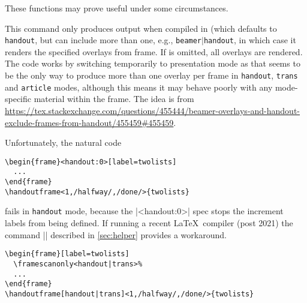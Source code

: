 \documentclass[a4paper]{ltxdoc}
\begin{document}
These functions may prove useful under some circumstances.

\begin{command}{\handoutframe{}}
  This command only produces output when compiled in  (which
  defaults to \texttt{handout}, but can include more than one, e.g.,
  \texttt{beamer$\mid$handout}, in which case it renders the specified overlays from frame.
  If  is omitted, all overlays are rendered.  The
  code works by switching temporarily to presentation mode as that seems to be
  the only way to produce more than one overlay per frame in \texttt{handout},
  \texttt{trans} and \texttt{article} modes, although this means it may behave
  poorly with any mode-specific material within the frame.  The idea is from
  \url{https://tex.stackexchange.com/questions/455444/beamer-overlays-and-handout-exclude-frames-from-handout/455459#455459}.
\end{command}

Unfortunately,  the natural code
\example
\begin{verbatim}
\begin{frame}<handout:0>[label=twolists]
  ...
\end{frame}
\handoutframe<1,/halfway/,/done/>{twolists}
\end{verbatim}
fails in \texttt{handout} mode, because the |<handout:0>| spec stops the
increment labels from being defined.  If running a recent \LaTeX\ compiler (post
2021) the command || described in \cref{sec:helper}
provides a workaround.
\example
\begin{verbatim}
\begin{frame}[label=twolists]
  \framescanonly<handout|trans>%
  ...
\end{frame}
\handoutframe[handout|trans]<1,/halfway/,/done/>{twolists}
\end{verbatim}


\end{document}
